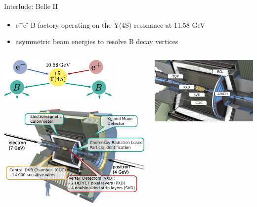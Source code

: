 \documentclass[presentation]{etp-beamer-fancy}
\begin{document}
\begin{frame}[label={sec:orge8cf8c9}]{Interlude: Belle II}
\begin{itemize}
\item e\textsuperscript{+}e\textsuperscript{-} B-factory operating on the Y(4S) resonance at 11.58 GeV
\item asymmetric beam energies to resolve B decay vertices
\end{itemize}
\begin{columns}
\begin{column}{0.6\columnwidth}
\begin{center}
\includegraphics[width=.5\textwidth]{./figures/eplus_eminus_to_b_bar_diagram.pdf}
\end{center}
\begin{center}
\includegraphics[width=\textwidth]{./figures/belle2_detector_dpgaachen.pdf}
\end{center}
\end{column}
\begin{column}{0.4\columnwidth}
\begin{center}
\includegraphics[width=.9\linewidth]{./figures/belle2_detector_trackingzoom.png}
\end{center}
\end{column}
\end{columns}
\end{frame}
\end{document}
